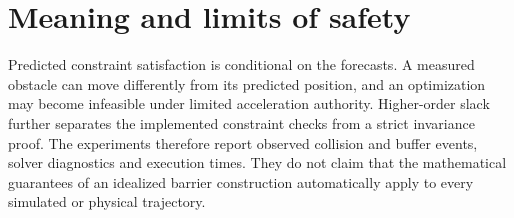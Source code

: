 \section{Meaning and limits of safety}
Predicted constraint satisfaction is conditional on the forecasts. A measured obstacle can move differently from its predicted position, and an optimization may become infeasible under limited acceleration authority. Higher-order slack further separates the implemented constraint checks from a strict invariance proof. The experiments therefore report observed collision and buffer events, solver diagnostics and execution times. They do not claim that the mathematical guarantees of an idealized barrier construction automatically apply to every simulated or physical trajectory.
